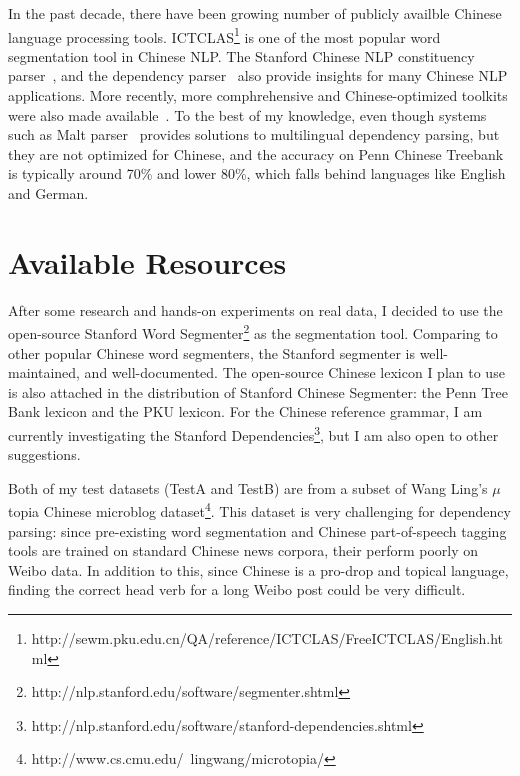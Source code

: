 \documentclass[11pt,letterpaper]{article}
\begin{document}
In the past decade, there have been growing number of publicly availble Chinese language processing tools.
ICTCLAS\footnote{http://sewm.pku.edu.cn/QA/reference/ICTCLAS/FreeICTCLAS/English.html} is one of the most popular word segmentation tool in Chinese NLP. The Stanford Chinese NLP constituency parser~\citep{levy2003harder},
and the dependency parser~\citep{chang2009discriminative} also provide insights for many Chinese NLP applications.
More recently, more comphrehensive and Chinese-optimized toolkits were also made available~\citep{qiu2013fudannlp,che2010ltp}.
To the best of my knowledge, even though systems such as Malt parser~\citep{nivre2007maltparser} provides solutions 
to multilingual dependency parsing, but they are not optimized for Chinese, and the accuracy on Penn Chinese Treebank is
typically around 70\% and lower 80\%, which falls behind languages like English and German.

\section{Available Resources}
After some research and hands-on experiments on real data, I decided to use the open-source Stanford Word Segmenter\footnote{http://nlp.stanford.edu/software/segmenter.shtml} as the
segmentation tool. Comparing to other popular Chinese word segmenters, the Stanford segmenter
is well-maintained, and well-documented. The open-source Chinese lexicon I plan to use
is also attached in the distribution of Stanford Chinese Segmenter: the Penn Tree Bank lexicon
and the PKU lexicon. For the Chinese reference grammar, I am currently investigating the 
Stanford Dependencies\footnote{http://nlp.stanford.edu/software/stanford-dependencies.shtml},
but I am also open to other suggestions.

Both of my test datasets (TestA and TestB) are from a subset of Wang Ling's $\mu$topia Chinese microblog dataset\footnote{http://www.cs.cmu.edu/~lingwang/microtopia/}.
This dataset is very challenging for dependency parsing:
since pre-existing word segmentation and Chinese part-of-speech tagging tools 
are trained on standard Chinese news corpora, their perform poorly
on Weibo data. In addition to this, since Chinese is a pro-drop 
and topical language, finding the correct head verb for a long Weibo post 
could be very difficult.
\end{document}
